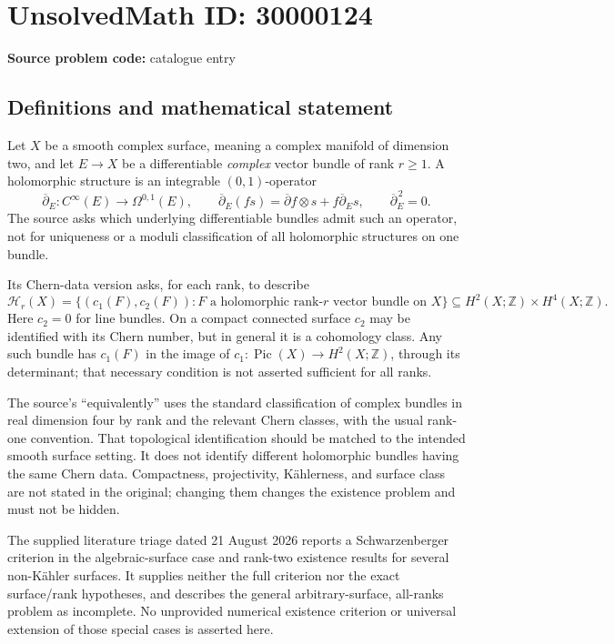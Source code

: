 \documentclass[11pt]{article}
\newcommand{\Z}{\mathbb{Z}}
\begin{document}
\section*{UnsolvedMath ID: 30000124}
\textbf{Source problem code:} catalogue entry
\subsection{Definitions and mathematical statement}
Let \(X\) be a smooth complex surface, meaning a complex manifold of dimension two, and let \(E\to X\) be a differentiable \emph{complex} vector bundle of rank \(r\geq1\). A holomorphic structure is an integrable \((0,1)\)-operator
\[
 \overline\partial_E:C^\infty(E)\to\Omega^{0,1}(E),\qquad
 \overline\partial_E(fs)=\overline\partial f\otimes s+f\overline\partial_Es,
 \qquad\overline\partial_E^{\,2}=0.
\]
The source asks which underlying differentiable bundles admit such an operator, not for uniqueness or a moduli classification of all holomorphic structures on one bundle.

Its Chern-data version asks, for each rank, to describe
\[
 \mathcal H_r(X)=\{(c_1(F),c_2(F)):F\text{ a holomorphic rank-}r\text{ vector bundle on }X\}
 \subseteq H^2(X;\Z)\times H^4(X;\Z).
\]
Here \(c_2=0\) for line bundles. On a compact connected surface \(c_2\) may be identified with its Chern number, but in general it is a cohomology class. Any such bundle has \(c_1(F)\) in the image of \(c_1:\operatorname{Pic}(X)\to H^2(X;\Z)\), through its determinant; that necessary condition is not asserted sufficient for all ranks.

The source's ``equivalently'' uses the standard classification of complex bundles in real dimension four by rank and the relevant Chern classes, with the usual rank-one convention. That topological identification should be matched to the intended smooth surface setting. It does not identify different holomorphic bundles having the same Chern data. Compactness, projectivity, K\"ahlerness, and surface class are not stated in the original; changing them changes the existence problem and must not be hidden.

The supplied literature triage dated 21 August 2026 reports a Schwarzenberger criterion in the algebraic-surface case and rank-two existence results for several non-K\"ahler surfaces. It supplies neither the full criterion nor the exact surface/rank hypotheses, and describes the general arbitrary-surface, all-ranks problem as incomplete. No unprovided numerical existence criterion or universal extension of those special cases is asserted here.
\end{document}
